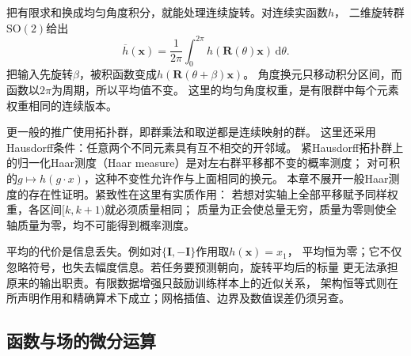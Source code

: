 把有限求和换成均匀角度积分，就能处理连续旋转。对连续实函数$h$，
二维旋转群$\mathrm{SO}(2)$给出
\[
 \overline h(\bm x)=\frac1{2\pi}\int_0^{2\pi}
 h(\bm R(\theta)\bm x)\,\mathrm d\theta.
\]
把输入先旋转$\beta$，被积函数变成$h(\bm R(\theta+\beta)\bm x)$。
角度换元只移动积分区间，而函数以$2\pi$为周期，所以平均值不变。
这里的均匀角度权重，是有限群中每个元素权重相同的连续版本。

更一般的推广使用拓扑群，即群乘法和取逆都是连续映射的群。
这里还采用Hausdorff条件：任意两个不同元素具有互不相交的开邻域。
紧Hausdorff拓扑群上的归一化Haar测度（Haar measure）是对左右群平移都不变的概率测度；
对可积的$g\mapsto h(g\cdot x)$，这种不变性允许作与上面相同的换元。
本章不展开一般Haar测度的存在性证明。紧致性在这里有实质作用：
若想对实轴上全部平移赋予同样权重，各区间$[k,k+1)$就必须质量相同；
质量为正会使总量无穷，质量为零则使全轴质量为零，均不可能得到概率测度。

平均的代价是信息丢失。例如对$\{\bm I,-\bm I\}$作用取$h(\bm x)=x_1$，
平均恒为零；它不仅忽略符号，也失去幅度信息。若任务要预测朝向，旋转平均后的标量
更无法承担原来的输出职责。有限数据增强只鼓励训练样本上的近似关系，
架构恒等式则在所声明作用和精确算术下成立；网格插值、边界及数值误差仍须另查。

\subsection{函数与场的微分运算}
\label{sec:functional-spatial-differentiation}
\label{sec:geometry-smoothness-geometric-operators}


